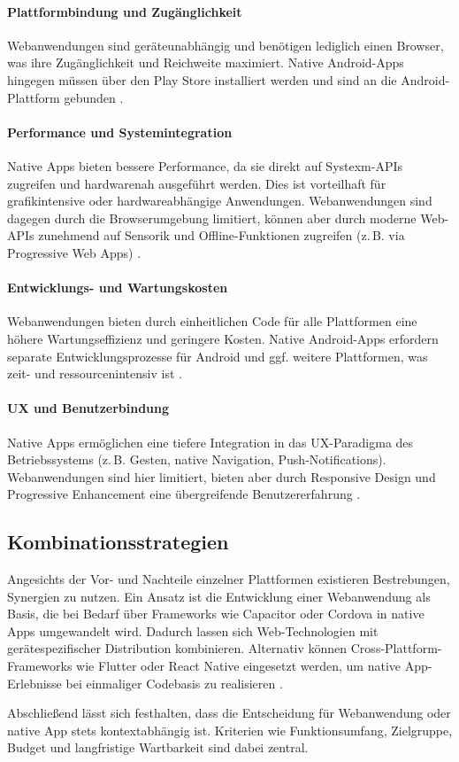\paragraph{Plattformbindung und Zugänglichkeit} Webanwendungen sind geräteunabhängig und benötigen lediglich einen Browser, was ihre Zugänglichkeit und Reichweite maximiert. Native Android-Apps hingegen müssen über den Play Store installiert werden und sind an die Android-Plattform gebunden \cite{Charland2011}.

\paragraph{Performance und Systemintegration} Native Apps bieten bessere Performance, da sie direkt auf Systexm-APIs zugreifen und hardwarenah ausgeführt werden. Dies ist vorteilhaft für grafikintensive oder hardwareabhängige Anwendungen. Webanwendungen sind dagegen durch die Browserumgebung limitiert, können aber durch moderne Web-APIs zunehmend auf Sensorik und Offline-Funktionen zugreifen (z.\,B. via Progressive Web Apps) \cite{Mahendra2021}.

\paragraph{Entwicklungs- und Wartungskosten} Webanwendungen bieten durch einheitlichen Code für alle Plattformen eine höhere Wartungseffizienz und geringere Kosten. Native Android-Apps erfordern separate Entwicklungsprozesse für Android und ggf. weitere Plattformen, was zeit- und ressourcenintensiv ist \cite{Mahendra2021}.

\paragraph{UX und Benutzerbindung} Native Apps ermöglichen eine tiefere Integration in das \ac{UX}-Paradigma des Betriebssystems (z.\,B. Gesten, native Navigation, Push-Notifications). Webanwendungen sind hier limitiert, bieten aber durch Responsive Design und Progressive Enhancement eine übergreifende Benutzererfahrung \cite{Charland2011}.

\subsection{Kombinationsstrategien}

Angesichts der Vor- und Nachteile einzelner Plattformen existieren Bestrebungen, Synergien zu nutzen. Ein Ansatz ist die Entwicklung einer Webanwendung als Basis, die bei Bedarf über Frameworks wie Capacitor oder Cordova in native Apps umgewandelt wird. Dadurch lassen sich Web-Technologien mit gerätespezifischer Distribution kombinieren. Alternativ können Cross-Plattform-Frameworks wie Flutter oder React Native eingesetzt werden, um native App-Erlebnisse bei einmaliger Codebasis zu realisieren \cite{Mahendra2021}.

\bigskip
Abschließend lässt sich festhalten, dass die Entscheidung für Webanwendung oder native App stets kontextabhängig ist. Kriterien wie Funktionsumfang, Zielgruppe, Budget und langfristige Wartbarkeit sind dabei zentral.

